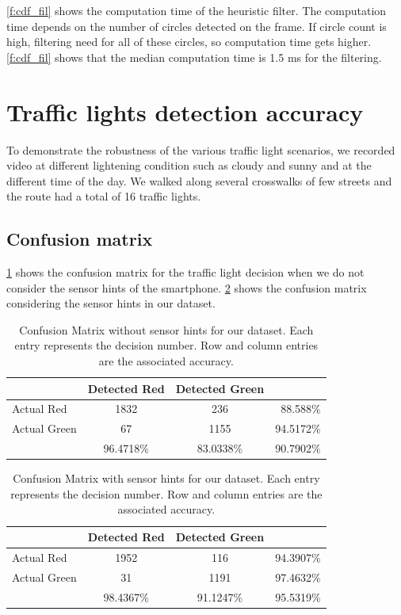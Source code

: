 \ref{f:cdf_fil} shows the computation time of the heuristic filter.
The computation time depends on the number of circles detected on the frame.
If circle count is high, filtering need for all of these circles, so computation time gets higher.
\ref{f:cdf_fil} shows that the median computation time is 1.5 ms for the filtering. 





\section{Traffic lights detection accuracy}
\label{s:acc}
To demonstrate the robustness of the various traffic light scenarios, we recorded video at different lightening condition such as cloudy and sunny and at the different time of the day.
We walked along several crosswalks of few streets and the route had a total of 16 traffic lights.

\subsection{Confusion matrix}
\ref{t:con_nocrp} shows the confusion matrix for the traffic light decision when we do not consider the sensor hints of the smartphone.
\ref{t:con_crp} shows the confusion matrix considering the sensor hints in our dataset.

\begin{table}[ht!]
  \centering
  \caption{Confusion Matrix without sensor hints for our dataset. Each entry represents the decision number. Row and column entries are the associated accuracy.}
  \label{t:con_nocrp}
  \begin{tabular}{  l  c  c  r }
    \rowcolor{gray!50}
     & Detected Red & Detected Green &  \\
    \hline
    Actual Red & 1832 & 236 & 88.588\% \\
    Actual Green & 67 & 1155 & 94.5172\% \\
    \hline
    & 96.4718\% & 83.0338\% & 90.7902\% \\
    
  \end{tabular}
\end{table}

\begin{table}[ht!]
  \centering
  \caption{Confusion Matrix with sensor hints for our  dataset. Each entry represents the decision number. Row and column entries are the associated accuracy.}
  \label{t:con_crp}
  \begin{tabular}{  l  c  c  r }
    \rowcolor{gray!50}
     & Detected Red & Detected Green &  \\
    \hline
    Actual Red & 1952 & 116 & 94.3907\% \\
    Actual Green & 31 & 1191 & 97.4632\% \\
    \hline
    & 98.4367\% & 91.1247\% & 95.5319\% \\
    
  \end{tabular}
\end{table}

